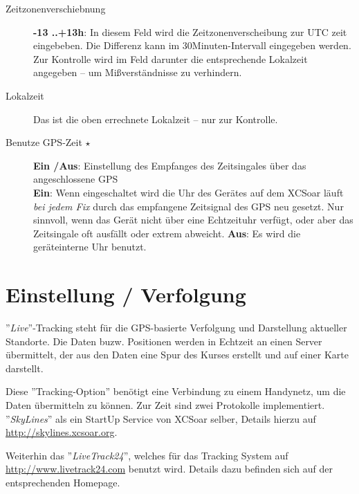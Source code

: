 \begin{description}
\item[Zeitzonenverschiebnung]  {\bf -13 ..+13h}: In diesem Feld wird die Zeitzonenverscheibung zur UTC zeit eingebeben. Die Differenz kann im 30Minuten-Intervall eingegeben werden.
Zur Kontrolle wird im Feld darunter die entsprechende Lokalzeit angegeben -- um Mißverständnisse zu verhindern.
\item[Lokalzeit]  Das ist die oben errechnete Lokalzeit -- nur zur Kontrolle.
\item[Benutze GPS-Zeit $\star$] {\bf Ein /Aus}: Einstellung des Empfanges des Zeitsingales über das angeschlossene GPS\\
{\bf Ein}: Wenn eingeschaltet wird die Uhr des Gerätes auf dem \textsf{XCSoar} läuft \textsl{bei jedem Fix} durch das empfangene Zeitsignal des GPS neu gesetzt.
Nur sinnvoll, wenn das Gerät nicht über eine Echtzeituhr verfügt, oder aber das Zeitsingale oft ausfällt oder extrem abweicht.
{\bf Aus}: Es wird die geräteinterne Uhr benutzt.
\end{description}

\section{Einstellung / Verfolgung}

''{\it Live}''-Tracking steht für die GPS-basierte Verfolgung und Darstellung aktueller Standorte.
Die Daten buzw. Positionen werden in Echtzeit an einen Server übermittelt, der aus den Daten
eine Spur des Kurses erstellt und auf einer Karte darstellt.

Diese ''Tracking-Option'' benötigt eine  Verbindung zu einem Handynetz, um die Daten übermitteln zu können.
Zur Zeit sind zwei Protokolle implementiert. ''{\em SkyLines}''  als ein StartUp Service von \textsf{XCSoar} selber,
Details hierzu auf  \url{http://skylines.xcsoar.org}.


Weiterhin das ''{\em LiveTrack24}'', welches für das Tracking System auf \url{http://www.livetrack24.com} benutzt wird.
Details dazu befinden sich auf der entsprechenden Homepage.

